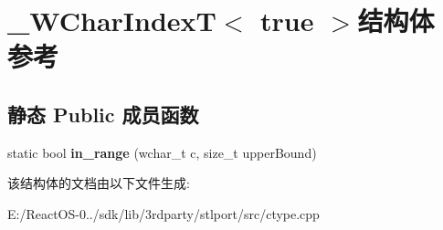 \hypertarget{struct___w_char_index_t_3_01true_01_4}{}\section{\+\_\+\+W\+Char\+IndexT$<$ true $>$结构体 参考}
\label{struct___w_char_index_t_3_01true_01_4}
\subsection*{静态 Public 成员函数}
\begin{DoxyCompactItemize}
\item 
\mbox{\label{struct___w_char_index_t_3_01true_01_4_ad7e4386368c3bd0de557553afd54d571}} 
static bool {\bfseries in\+\_\+range} (wchar\+\_\+t c, size\+\_\+t upper\+Bound)
\end{DoxyCompactItemize}


该结构体的文档由以下文件生成\+:\begin{DoxyCompactItemize}
\item 
E\+:/\+React\+O\+S-\/0../sdk/lib/3rdparty/stlport/src/ctype.\+cpp\end{DoxyCompactItemize}
